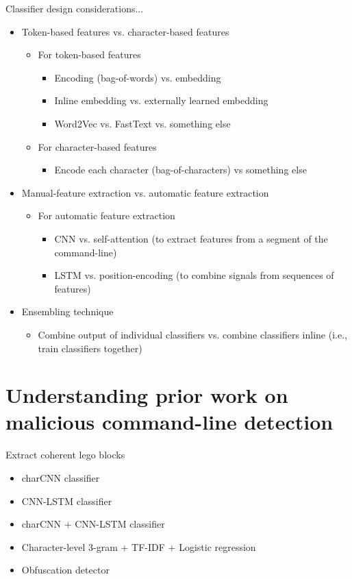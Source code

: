 \documentclass[10pt]{beamer}
\begin{document}
\begin{frame}{Classifier design considerations...}
	\begin{itemize}
		\item Token-based features vs. character-based features
		\begin{itemize}
			\item For token-based features
			\begin{itemize}
				\item Encoding (bag-of-words) vs. embedding
				\item Inline embedding vs. externally learned embedding
				\item Word2Vec vs. FastText vs. something else
			\end{itemize}
			\item For character-based features
			\begin{itemize}
				\item Encode each character (bag-of-characters) vs something else
			\end{itemize}
		\end{itemize}
		\item Manual-feature extraction vs. automatic feature extraction
		\begin{itemize}
			\item For automatic feature extraction
			\begin{itemize}
				\item CNN vs. self-attention (to extract features from a segment of the command-line)
				\item LSTM vs. position-encoding (to combine signals from sequences of features)
			\end{itemize}
		\end{itemize}
		\item Ensembling technique
		\begin{itemize}
			\item Combine output of individual classifiers vs. combine classifiers inline (i.e., train classifiers together)
		\end{itemize}
	\end{itemize}
\end{frame}

\section{Understanding prior work on malicious command-line detection}

\begin{frame}[fragile]{Extract coherent lego blocks}
	\begin{itemize}
		\item charCNN classifier \cite{charcnn2016,charcnn2019,powershell2018}
		\item CNN-LSTM classifier \cite{amsi2019}
		\item charCNN + CNN-LSTM classifier \cite{amsi2019}
		\item Character-level 3-gram + TF-IDF + Logistic regression \cite{amsi2019}
		\item Obfuscation detector \cite{feye2018}
	\end{itemize}
\end{frame}
\end{document}
